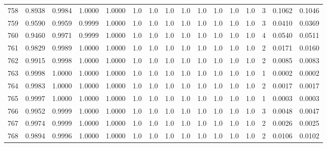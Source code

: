 \begin{tabular}{lrrrrrrrrrrrrrrr}
758 &      0.8938 &  0.9984 &  1.0000 &  1.0000 &     1.0 &     1.0 &     1.0 &     1.0 &     1.0 &     1.0 &      1.0 &        1.0 &      3 &                    0.1062 &                     0.1046 \\
759 &      0.9590 &  0.9959 &  0.9999 &  1.0000 &     1.0 &     1.0 &     1.0 &     1.0 &     1.0 &     1.0 &      1.0 &        1.0 &      3 &                    0.0410 &                     0.0369 \\
760 &      0.9460 &  0.9971 &  0.9999 &  1.0000 &     1.0 &     1.0 &     1.0 &     1.0 &     1.0 &     1.0 &      1.0 &        1.0 &      4 &                    0.0540 &                     0.0511 \\
761 &      0.9829 &  0.9989 &  1.0000 &  1.0000 &     1.0 &     1.0 &     1.0 &     1.0 &     1.0 &     1.0 &      1.0 &        1.0 &      2 &                    0.0171 &                     0.0160 \\
762 &      0.9915 &  0.9998 &  1.0000 &  1.0000 &     1.0 &     1.0 &     1.0 &     1.0 &     1.0 &     1.0 &      1.0 &        1.0 &      2 &                    0.0085 &                     0.0083 \\
763 &      0.9998 &  1.0000 &  1.0000 &  1.0000 &     1.0 &     1.0 &     1.0 &     1.0 &     1.0 &     1.0 &      1.0 &        1.0 &      1 &                    0.0002 &                     0.0002 \\
764 &      0.9983 &  1.0000 &  1.0000 &  1.0000 &     1.0 &     1.0 &     1.0 &     1.0 &     1.0 &     1.0 &      1.0 &        1.0 &      2 &                    0.0017 &                     0.0017 \\
765 &      0.9997 &  1.0000 &  1.0000 &  1.0000 &     1.0 &     1.0 &     1.0 &     1.0 &     1.0 &     1.0 &      1.0 &        1.0 &      1 &                    0.0003 &                     0.0003 \\
766 &      0.9952 &  0.9999 &  1.0000 &  1.0000 &     1.0 &     1.0 &     1.0 &     1.0 &     1.0 &     1.0 &      1.0 &        1.0 &      3 &                    0.0048 &                     0.0047 \\
767 &      0.9974 &  0.9999 &  1.0000 &  1.0000 &     1.0 &     1.0 &     1.0 &     1.0 &     1.0 &     1.0 &      1.0 &        1.0 &      2 &                    0.0026 &                     0.0025 \\
768 &      0.9894 &  0.9996 &  1.0000 &  1.0000 &     1.0 &     1.0 &     1.0 &     1.0 &     1.0 &     1.0 &      1.0 &        1.0 &      2 &                    0.0106 &                     0.0102 \\

\end{tabular}
